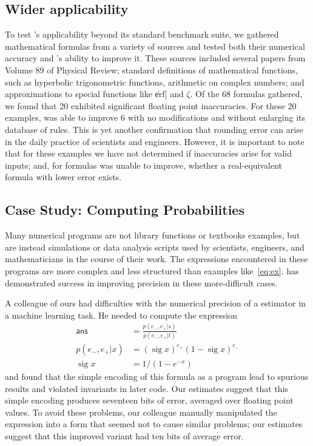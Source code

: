 \documentclass[paper.tex]{subfiles}
\begin{document}
\subsection{Wider applicability}

To test \casio's applicability beyond its standard benchmark suite,
  we gathered mathematical formulas from a variety of sources
  and tested both their numerical accuracy
  and \casio's ability to improve it.
These sources included several papers from Volume 89 of Physical Review;
  standard definitions of mathematical functions,
  such as hyperbolic trigonometric functions,
  arithmetic on complex numbers;
  and approximations to special functions like \|erf| and $\zeta$.
Of the 68 formulas gathered, we found that
  20 exhibited significant floating point inaccuracies.
For these 20 examples, \casio was able to improve 6
  with no modifications and without enlarging its database of rules.
This is yet another confirmation
  that rounding error can arise in the daily practice of scientists and engineers.
However, it is important to note that for these examples
  we have not determined if inaccuracies arise for valid inputs;
  and, for formulas \casio was unable to improve,
  whether a real-equivalent formula with lower error exists.

\subsection{Case Study: Computing Probabilities}
Many numerical programs are not library functions or textbooks examples, 
  but are instead simulations or data analysis scripts
  used by scientists, engineers, and mathematicians
  in the course of their work.
The expressions encountered in these programs are more complex
  and less structured than examples like~\eqref{eq:ex}.
\casio has demonstrated success in improving precision
  in these more-difficult cases.

A colleague of ours had difficulties with the numerical precision
  of a estimator in a machine learning task.
He needed to compute the expression
\begin{align*}
\mathsf{ans} &= \frac{p(e_-,e_+|s)}{p(e_-,e_+|t)} \\
p(e_-, e_+|x) &= (\operatorname{sig} x)^{e_+} (1 - \operatorname{sig} x)^{e_-} \\
\operatorname{sig}x &= 1 / (1 - e^{-x})
\end{align*}
  and found that the simple encoding of this formula as a program
  lead to spurious results and violated invariants in later code.
Our estimates suggest that this simple encoding produces
  seventeen bits of error, averaged over floating point values.
To avoid these problems,
  our colleague manually manipulated the expression
  into a form that seemed not to cause similar problems;
  our estimates suggest that this improved variant
  had ten bits of average error.
\end{document}
